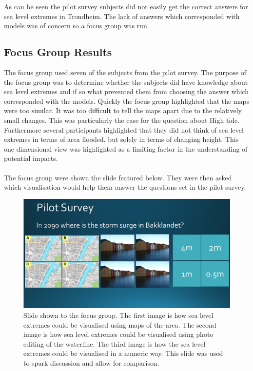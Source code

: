 As can be seen the pilot survey subjects did not easily get the correct answers for sea level extremes in Trondheim. The lack of answers which corresponded with models was of concern so a focus group was run. 

\newpage
\subsection{Focus Group Results}
The focus group used seven of the subjects from the pilot survey. The purpose of the focus group was to determine whether the subjects did have knowledge about sea level extremes and if so what prevented them from choosing the answer which corresponded with the models. Quickly the focus group highlighted that the maps were too similar. It was too difficult to tell the maps apart due to the relatively small changes. This was particularly the case for the question about High tide. Furthermore several participants highlighted that they did not think of sea level extremes in terms of area flooded, but solely in terms of changing height. This one dimensional view was highlighted as a limiting factor in the understanding of potential impacts. 
\paragraph{}

The focus group were shown the slide featured below. They were then asked which visualisation would help them answer the questions set in the pilot survey.
\begin{figure}[h!]
    \centering
    \includegraphics[width=1\textwidth]{fig_results/slide-pilot-survey.png}
    \caption{Slide shown to the focus group. The first image is how sea level extremes could be visualised using maps of the area. The second image is how sea level extremes could be visualised using photo editing of the waterline. The third image is how the sea level extremes could be visualised in a numeric way. This slide was used to spark discussion and allow for comparison.}
    \label{fig:slide}
\end{figure}

